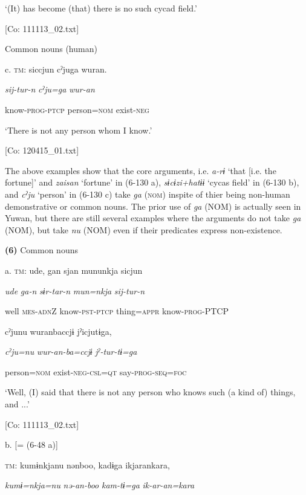       ‘(It) has become (that) there is no such cycad field.’

      [Co: 111113\_02.txt]

  Common nouns (human)

  c.  \textsc{tm}:  siccjun  cˀjuga  wuran.

      \textit{sij-tur-n}  \textit{cˀju=ga}  \textit{wur-an}

      know-\textsc{prog}-\textsc{ptcp}  person=\textsc{nom}  exist-\textsc{neg}

      ‘There is not any person whom I know.’

      [Co: 120415\_01.txt]

The above examples show that the core arguments, i.e. \textit{a-rɨ} ‘that [i.e. the fortune]’ and \textit{zaisan} ‘fortune’ in (6-130 a), \textit{sɨcɨzi+hatɨɨ} ‘cycas field’ in (6-130 b), and \textit{cˀju} ‘person’ in (6-130 c) take \textit{ga} (\textsc{nom}) inspite of thier being non-human demonstrative or common nouns. The prior use of \textit{ga} (NOM) is actually seen in Yuwan, but there are still several examples where the arguments do not take \textit{ga} (NOM), but take \textit{nu} (NOM) even if their predicates express non-existence.

\textbf{(6)}  Common nouns

  a.  \textsc{tm}:  ude,  gan  sjan  mununkja  sicjun

      \textit{ude}  \textit{ga-n}  \textit{sɨr-tar-n}  \textit{mun=nkja}  \textit{sij-tur-n}

      well  \textsc{mes}-\textsc{adn}Z  know-\textsc{pst}-\textsc{ptcp}  thing=\textsc{appr}  know-\textsc{prog}-PTCP

      cˀjunu  wuranbaccjɨ  jˀicjutɨga,

      \textit{cˀju=nu}  \textit{wur-an-ba=ccjɨ}  \textit{jˀ-tur-tɨ=ga}

      person=\textsc{nom}  exist-\textsc{neg}-\textsc{csl}=\textsc{qt}  say-\textsc{prog}-\textsc{seq}=\textsc{foc}

      ‘Well, (I) said that there is not any person who knows such (a kind of) things, and ...’

      [Co: 111113\_02.txt]

  b.  [= (6-48 a)]

    \textsc{tm}:  kumɨnkjanu  nənboo,  kadɨga  ikjarankara,

      \textit{kumɨ=nkja=nu}  \textit{nə-an-boo}  \textit{kam-tɨ=ga}  \textit{ik-ar-an=kara}

